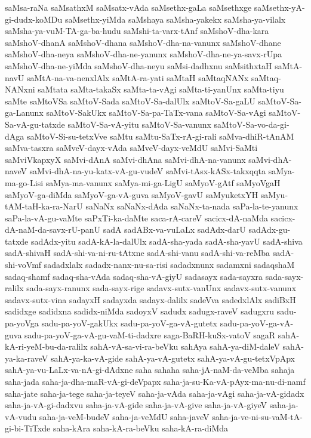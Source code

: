 {saMsa-raNa
saMsathxM
saMsatx-vAda
saMsethx-gaLa
saMsethxge
saMsethx-yA-gi-dudx-koMDu
saMsethx-yiMda
saMshaya
saMsha-yakekx
saMsha-ya-vilalx
saMsha-ya-vuM-TA-ga-ba-hudu
saMshi-ta-varx-tAnf
saMshoV-dha-kara
saMshoV-dhanA
saMshoV-dhana
saMshoV-dha-na-vanunx
saMshoV-dhane
saMshoV-dha-neya
saMshoV-dha-ne-yanunx
saMshoV-dha-ne-ya-savx-rUpa
saMshoV-dha-ne-yiMda
saMshoV-dha-neyu
saMsi-dadhxnu
saMsithxtaH
saMtA-navU
saMtA-na-va-nenxlAlx
saMtA-ra-yati
saMtaH
saMtaqNANx
saMtaq-NANxni
saMtata
saMta-takaSx
saMta-ta-vAgi
saMta-ti-yanUnx
saMta-tiyu
saMte
saMtoVSa
saMtoV-Sada
saMtoV-Sa-dalUlx
saMtoV-Sa-gaLU
saMtoV-Sa-ga-Lanunx
saMtoV-SakUkx
saMtoV-Sa-pa-TaTx-vana
saMtoV-Sa-vAgi
saMtoV-Sa-vA-gu-tatxde
saMtoV-Sa-vA-yitu
saMtoV-Sa-vanunx
saMtoV-Sa-vo-da-gi-dAga
saMtoV-Si-su-tetxVve
saMtu
saMtu-SaTx-rA-gi-rali
saMva-dhiR-tAnAM
saMva-tasxra
saMveV-dayx-vAda
saMveV-dayx-veMdU
saMvi-SaMti
saMviVkapxyX
saMvi-dAnA
saMvi-dhAna
saMvi-dhA-na-vanunx
saMvi-dhA-naveV
saMvi-dhA-na-yu-katx-vA-gu-vudeV
saMvi-tAsx-kASx-takxqqta
saMya-ma-go-Lisi
saMya-ma-vanunx
saMya-mi-ga-LigU
saMyoV-gAtf
saMyoVgaH
saMyoV-ga-diMda
saMyoV-ga-vA-guva
saMyoV-gavU
saMyuketxYH
saMyu-tAM-taH-ka-ra-NarU
saNaNx
saNaNx-dAda
saNaNx-ta-nada
saPa-la-te-yanunx
saPa-la-vA-gu-vaMte
saPxTi-ka-daMte
saca-rA-careV
sacicx-dA-naMda
sacicx-dA-naM-da-savx-rU-panU
sadA
sadABx-va-vuLaLx
sadAdx-darU
sadAdx-gu-tatxde
sadAdx-yitu
sadA-kA-la-dalUlx
sadA-sha-yada
sadA-sha-yavU
sadA-shiva
sadA-shivaH
sadA-shi-va-ni-ru-tAtxne
sadA-shi-vanu
sadA-shi-va-reMba
sadA-shi-voVmf
sadadxlalx
sadadx-nanx-nu-sa-risi
sadadxnunx
sadamxni
sadaqshaM
sadaq-shamf
sadaq-sha-vAda
sadaq-sha-vA-giyU
sadasayx
sada-sayxra
sada-sayx-ralilx
sada-sayx-ranunx
sada-sayx-rige
sadavx-sutx-vanUnx
sadavx-sutx-vanunx
sadavx-sutx-vina
sadayxH
sadayxda
sadayx-dalilx
sadeVva
sadedxlAlx
sadiBxH
sadidxge
sadidxna
sadidx-niMda
sadoyxV
sadudx
sadugx-raveV
sadugxru
sadu-pa-yoVga
sadu-pa-yoV-gakUkx
sadu-pa-yoV-ga-vA-gutetx
sadu-pa-yoV-ga-vA-guva
sadu-pa-yoV-ga-vA-gu-vaM-ti-dadxre
saga-BaRH-kuSx-vatoV
sagaR
sahA-kA-ri-yeM-bu-da-ralilx
sahA-vA-sa-vi-ra-beVku
sahAya
sahA-ya-diM-daleV
sahA-ya-ka-raveV
sahA-ya-ka-vA-gide
sahA-ya-vA-gutetx
sahA-ya-vA-gu-tetxVpApx
sahA-ya-vu-LaLx-va-nA-gi-dAdxne
saha
sahaha
saha-jA-naM-da-veMba
sahaja
saha-jada
saha-ja-dha-maR-vA-gi-deVpapx
saha-ja-su-Ka-vA-pAyx-ma-nu-di-namf
saha-jate
saha-ja-tege
saha-ja-teyeV
saha-ja-vAda
saha-ja-vAgi
saha-ja-vA-gidadx
saha-ja-vA-gi-dadxvu
saha-ja-vA-gide
saha-ja-vA-give
saha-ja-vA-giyeV
saha-ja-vA-vudu
saha-ja-veM-budeV
saha-ja-veMdU
saha-javeV
saha-ja-ve-ni-su-vaM-tA-gi-bi-TiTxde
saha-kAra
saha-kA-ra-beVku
saha-kA-ra-diMda
}
